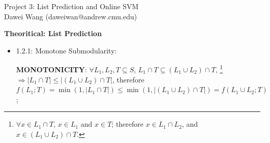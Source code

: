 \documentclass{article}
\newcommand{\abs}[1]{\left\lvert{#1}\right\rvert}
\begin{document}
\RaggedRight
\pagestyle{fancy}


{\large Project 3: List Prediction and Online SVM} \\[0.5\parsep]
Dawei Wang (daweiwan@andrew.cmu.edu)

\vspace{1em}
{\large\bf Theoritical: List Prediction}

\begin{itemize}

	\item 1.2.1: Monotone Submodularity: 
	
		{\bf\small MONOTONICITY}: $\forall L_1,L_2,T\subseteq S$, 
		$L_1\cap T\subseteq(L_1\cup L_2)\cap T$, \footnote{$\forall x\in L_1\cap T$,
			$x\in L_1$ and $x\in T$; therefore $x\in L_1\cap L_2$, and $x\in(L_1\cup L_2)\cap T$.}
 		$\Rightarrow\abs{L_1\cap T}\le\abs{(L_1\cup L_2)\cap T}$, therefore
 		$f(L_1;T)=\min(1,\abs{L_1\cap T})\le\min(1,\abs{(L_1\cup L_2)\cap T})=f(L_1\cup L_2;T)$;
 		

\end{itemize}
\end{document}

